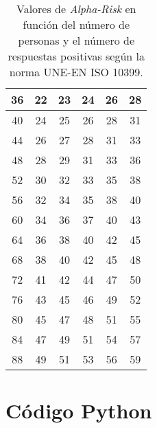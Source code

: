 \documentclass[11pt,a4paper,twoside]{book}
\begin{document}
\begin{table}[H]
\begin{center}
\begin{scriptsize}
\begin{tabular}{| c || c | c | c | c | c |}
                36&22&23&24&26&28\\ \hline
                40&24&25&26&28&31\\ \hline
                44&26&27&28&31&33\\ \hline
                48&28&29&31&33&36\\ \hline
                52&30&32&33&35&38\\ \hline
                56&32&34&35&38&40\\ \hline
                60&34&36&37&40&43\\ \hline
                64&36&38&40&42&45\\ \hline
                68&38&40&42&45&48\\ \hline
                72&41&42&44&47&50\\ \hline
                76&43&45&46&49&52\\ \hline
                80&45&47&48&51&55\\ \hline
                84&47&49&51&54&57\\ \hline
                88&49&51&53&56&59\\ \hline
			\end{tabular}
			\caption{Valores de \textit{Alpha-Risk} en función del número de personas y el número de respuestas positivas según la norma UNE-EN ISO 10399.}
			\label{tablaAlpha}
			\end{scriptsize}
			\end{center}	
		\end{table}
		
\chapter{Código Python}
\end{document}
